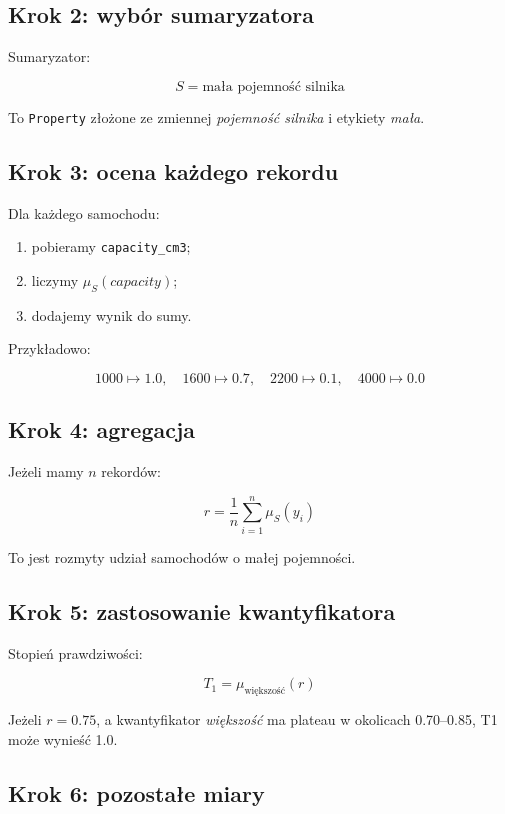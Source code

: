 \documentclass[11pt,a4paper]{article}
\newcommand{\code}[1]{\texttt{#1}}
\begin{document}
\subsection{Krok 2: wybór sumaryzatora}

Sumaryzator:

\[
S=\text{mała pojemność silnika}
\]

To \code{Property} złożone ze zmiennej \emph{pojemność silnika} i etykiety \emph{mała}.

\subsection{Krok 3: ocena każdego rekordu}

Dla każdego samochodu:

\begin{enumerate}
    \item pobieramy \code{capacity\_cm3};
    \item liczymy \(\mu_S(capacity)\);
    \item dodajemy wynik do sumy.
\end{enumerate}

Przykładowo:

\[
1000 \mapsto 1.0,\quad 1600 \mapsto 0.7,\quad 2200 \mapsto 0.1,\quad 4000 \mapsto 0.0
\]

\subsection{Krok 4: agregacja}

Jeżeli mamy \(n\) rekordów:

\[
r=\frac{1}{n}\sum_{i=1}^{n}\mu_S(y_i)
\]

To jest rozmyty udział samochodów o małej pojemności.

\subsection{Krok 5: zastosowanie kwantyfikatora}

Stopień prawdziwości:

\[
T_1=\mu_{\text{większość}}(r)
\]

Jeżeli \(r=0.75\), a kwantyfikator \emph{większość} ma plateau w okolicach 0.70--0.85, T1 może wynieść 1.0.

\subsection{Krok 6: pozostałe miary}
\end{document}
